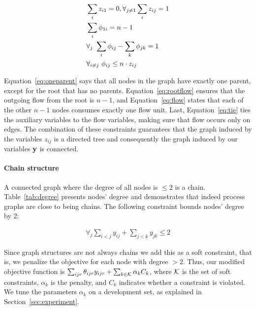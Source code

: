 \begin{align}
\small &\sum_{i} z_{i1} =0, \forall_{j \neq 1} \sum_{i} z_{ij}=1 \label{eq:oneparent} \\ 
&\sum_{i} \phi_{1i}=n-1 \label{eq:rootflow} \\ 
&\forall_{j} \ \sum_{i} \phi_{ij} - \sum_{k} \phi_{jk}=1 \label{eq:flow} \\
&\forall_{i \neq j} \ \phi_{ij} \leq n \cdot z_{ij} \label{eq:tie} 
\end{align}

Equation~\ref{eq:oneparent} says that all nodes in the graph have exactly one parent, except for the root that has no parents. Equation~\ref{eq:rootflow} ensures that the outgoing flow from the root is $n-1$, and Equation~\ref{eq:flow} states that each of the other $n-1$ nodes consumes exactly one flow unit. Last, Equation~\ref{eq:tie} ties the auxiliary variables to the flow variables, making sure that flow occurs only on edges. The combination of these constraints guarantees that the graph induced by the variables $z_{ij}$ is a directed tree and consequently the graph induced by our variables $\mathbf{y}$ is connected.

\paragraph{Chain structure} 
A connected graph where the degree of all nodes is $\leq 2$ is a chain. Table~\ref{tab:degree} presents nodes' degree and demonstrates that indeed process graphs are close to being chains. The following constraint bounds nodes' degree by 2:

\begin{align}
\forall_j \sum_{i<j} y_{ij} + \sum_{j<k} y_{jk} \leq 2
\end{align}

Since graph structures are not always chains we add this as a soft constraint, that is, we penalize the objective for each node with degree $>2$. Thus, our modified objective function is $\sum_{ijr} \theta_{ijr} y_{ijr} + \sum_{k \in \mathcal{K}} \alpha_k C_k$, where $\mathcal{K}$ is the set of soft constraints, $\alpha_k$ is the penalty, and $C_k$ indicates whether a constraint is violated. We tune the parameters $\alpha_k$ on a development set, as explained in Section~\ref{sec:experiment}.

